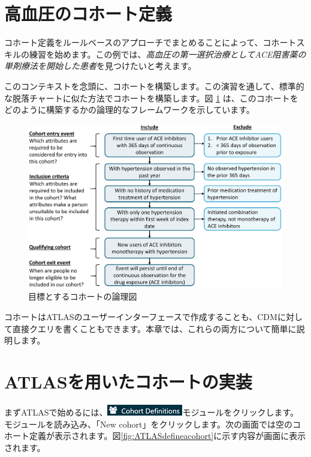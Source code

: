 \documentclass[
  11pt]{book}
\theoremstyle{definition}
\theoremstyle{definition}
\theoremstyle{definition}
\theoremstyle{definition}
\theoremstyle{remark}
\begin{document}
\section{高血圧のコホート定義}\label{ux9ad8ux8840ux5727ux306eux30b3ux30dbux30fcux30c8ux5b9aux7fa9}

コホート定義をルールベースのアプローチでまとめることによって、コホートスキルの練習を始めます。この例では、\emph{高血圧の第一選択治療としてACE阻害薬の単剤療法を開始した患者}を見つけたいと考えます。

このコンテキストを念頭に、コホートを構築します。この演習を通して、標準的な脱落チャートに似た方法でコホートを構築します。図 \ref{fig:CohortPractice} は、このコホートをどのように構築するかの論理的なフレームワークを示しています。

\begin{figure}

{\centering \includegraphics[width=1\linewidth]{images/Cohorts/CohortPractice} 

}

\caption{目標とするコホートの論理図}\label{fig:CohortPractice}
\end{figure}

コホートはATLASのユーザーインターフェースで作成することも、CDMに対して直接クエリを書くこともできます。本章では、これらの両方について簡単に説明します。

\section{ATLASを用いたコホートの実装}\label{atlasux3092ux7528ux3044ux305fux30b3ux30dbux30fcux30c8ux306eux5b9fux88c5}

まずATLASで始めるには、\includegraphics{images/Cohorts/cohortdefinition.png}モジュールをクリックします。モジュールを読み込み、「New cohort」をクリックします。次の画面では空のコホート定義が表示されます。図\ref{fig:ATLASdefineacohort}に示す内容が画面に表示されます。
\end{document}
